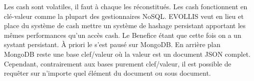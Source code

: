 Les cash sont volatiles, il faut à chaque les réconstitués. Les cash
fonctionnent en clé-valeur comme la plupart des gestionnaires NoSQL.
EVOLLIS veut en lieu et place du système de cash mettre un système de
hashage persistant apportant les mêmes performances qu'un accès cash.
Le Benefice étant que cette fois on a un systant persistant. À priori
le s'est pausé sur MongoDB. En arrière plan MongoDB reste une base
clef/valeur où la valeur est un document JSON complet. Cependant,
contrairement aux bases purement clef/valeur, il est possible de
requêter sur n’importe quel élément du document ou sous document.
